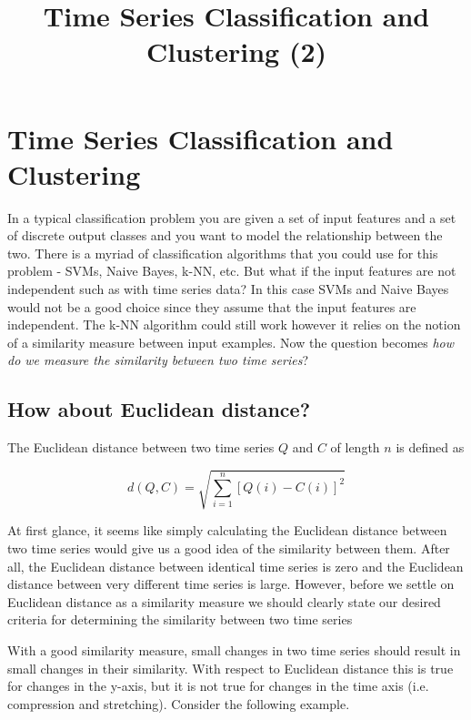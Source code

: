 \documentclass[11pt]{article}
\title{Time Series Classification and Clustering (2)}
\begin{document}
    
    
    \maketitle
    
    

    
    \section{Time Series Classification and
Clustering}\label{time-series-classification-and-clustering}

    In a typical classification problem you are given a set of input
features and a set of discrete output classes and you want to model the
relationship between the two. There is a myriad of classification
algorithms that you could use for this problem - SVMs, Naive Bayes,
k-NN, etc. But what if the input features are not independent such as
with time series data? In this case SVMs and Naive Bayes would not be a
good choice since they assume that the input features are independent.
The k-NN algorithm could still work however it relies on the notion of a
similarity measure between input examples. Now the question becomes
\emph{how do we measure the similarity between two time series}?

    \subsection{How about Euclidean
distance?}\label{how-about-euclidean-distance}

    The Euclidean distance between two time series \(Q\) and \(C\) of length
\(n\) is defined as

\[d(Q,C) = \sqrt{\sum^n_{i=1}[Q(i)-C(i)]^2}\]

At first glance, it seems like simply calculating the Euclidean distance
between two time series would give us a good idea of the similarity
between them. After all, the Euclidean distance between identical time
series is zero and the Euclidean distance between very different time
series is large. However, before we settle on Euclidean distance as a
similarity measure we should clearly state our desired criteria for
determining the similarity between two time series

    With a good similarity measure, small changes in two time series should
result in small changes in their similarity. With respect to Euclidean
distance this is true for changes in the y-axis, but it is not true for
changes in the time axis (i.e. compression and stretching). Consider the
following example.
\end{document}
